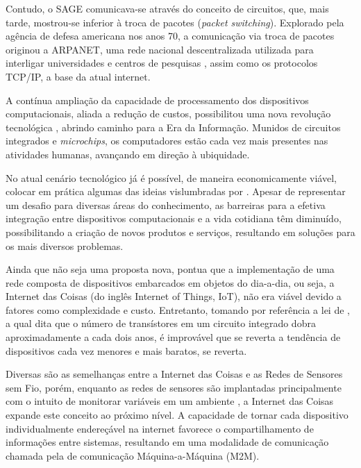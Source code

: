 \documentclass[twoside,english,brazilian]{UNISINOSmonografia}
\begin{document}
	Contudo, o SAGE comunicava-se através do conceito de circuitos, que, mais 
	tarde, mostrou-se inferior à troca de pacotes (\textit{packet switching}). 
	Explorado pela agência de defesa americana nos anos 70, a comunicação via 
	troca de pacotes originou a ARPANET, uma rede nacional descentralizada 
	utilizada para interligar universidades e centros de pesquisas 
	\cite{ARPANET1964}, assim como os protocolos TCP/IP, a base da atual 
	internet.

	A contínua ampliação da capacidade de processamento dos dispositivos 
	computacionais, aliada a redução de custos, possibilitou uma nova 
	revolução tecnológica \cite{Atzori2010b}, abrindo caminho para a Era da 
	Informação.
	Munidos de circuitos integrados e \textit{microchips}, os computadores 
	estão cada vez mais presentes nas atividades humanas, avançando em direção 
	à ubiquidade.
	
	No atual cenário tecnológico já é possível, de maneira economicamente 
	viável, colocar em prática algumas das ideias vislumbradas por 
	. 
	Apesar de representar um desafio para diversas áreas do conhecimento, as 
	barreiras para a efetiva integração entre dispositivos computacionais e a 
	vida cotidiana têm diminuído, possibilitando a criação de novos produtos e 
	serviços, resultando em soluções para os mais diversos problemas.
	
	Ainda que não seja uma proposta nova,  pontua que a 
	implementação de uma rede composta de dispositivos embarcados em objetos 
	do dia-a-dia, ou seja, a Internet das Coisas 
	(do inglês Internet of Things, IoT), 
	não era viável devido a fatores como complexidade e custo. 
	Entretanto, tomando por referência a lei de , a qual 
	dita que o número de transístores em um circuito integrado dobra 
	aproximadamente a cada dois anos, é improvável que se reverta a tendência 
	de dispositivos cada vez menores e mais baratos, se reverta.
	
	Diversas são as semelhanças entre a Internet das Coisas e as Redes de 
	Sensores sem Fio, porém, enquanto as redes de sensores  
	são implantadas principalmente com o intuito de monitorar variáveis em um 
	ambiente \cite{Sakthidharan2012}, a Internet das Coisas expande este 
	conceito ao próximo nível. 
	A capacidade de tornar cada dispositivo individualmente endereçável na 
	internet favorece o compartilhamento de informações entre sistemas, 
	resultando em uma modalidade de comunicação chamada pela 
	 de comunicação Máquina-a-Máquina (M2M).
	
\end{document}
